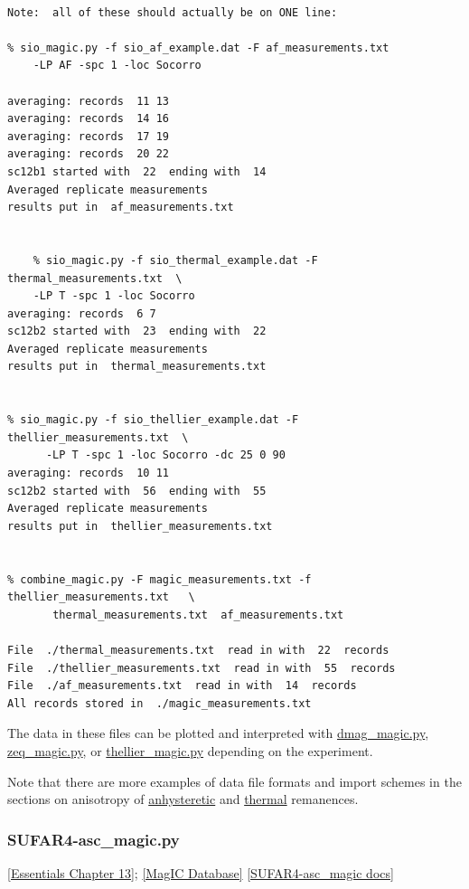 \documentclass[11pt]{book}
\begin{document}
{{\begin{verbatim}

Note:  all of these should actually be on ONE line:

% sio_magic.py -f sio_af_example.dat -F af_measurements.txt
    -LP AF -spc 1 -loc Socorro

averaging: records  11 13
averaging: records  14 16
averaging: records  17 19
averaging: records  20 22
sc12b1 started with  22  ending with  14
Averaged replicate measurements
results put in  af_measurements.txt


    % sio_magic.py -f sio_thermal_example.dat -F thermal_measurements.txt  \
    -LP T -spc 1 -loc Socorro
averaging: records  6 7
sc12b2 started with  23  ending with  22
Averaged replicate measurements
results put in  thermal_measurements.txt


% sio_magic.py -f sio_thellier_example.dat -F  thellier_measurements.txt  \
      -LP T -spc 1 -loc Socorro -dc 25 0 90
averaging: records  10 11
sc12b2 started with  56  ending with  55
Averaged replicate measurements
results put in  thellier_measurements.txt


% combine_magic.py -F magic_measurements.txt -f  thellier_measurements.txt   \
       thermal_measurements.txt  af_measurements.txt

File  ./thermal_measurements.txt  read in with  22  records
File  ./thellier_measurements.txt  read in with  55  records
File  ./af_measurements.txt  read in with  14  records
All records stored in  ./magic_measurements.txt

 \end{verbatim}

The data in these files can be plotted and interpreted with \href{#dmag_magic.py}{dmag\_magic.py}, \href{#zeq_magic.py}{zeq\_magic.py}, or \href{#thellier_magic.py}{ thellier\_magic.py}  depending on the experiment.

Note that there are more examples of data file formats and import schemes in the sections on anisotropy of \href{#aarm_magic.py}{anhysteretic}  and \href{#atrm_magic.py}{thermal} remanences.


\subsubsection{SUFAR4-asc\_magic.py}
\href{http://earthref.org/MAGIC/books/Tauxe/Essentials/WebBook3ch13.html#ch13}{[Essentials Chapter 13]};
\href{#MagICDatabase}{[MagIC Database]}
\href{https://github.com/PmagPy/PmagPy/blob/master/programs/SUFAR4-asc_magic.py}{[SUFAR4-asc\_magic docs]}


}}
\end{document}
